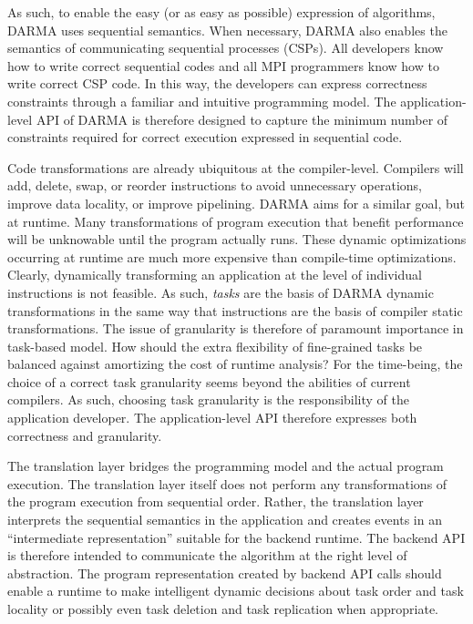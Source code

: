As such, to enable the easy (or as easy as possible) expression of algorithms, DARMA uses sequential semantics.
When necessary, DARMA also enables the semantics of communicating sequential processes (CSPs).
All developers know how to write correct sequential codes and all MPI programmers know how to write correct CSP code.
In this way, the developers can express correctness constraints through a familiar and intuitive programming model.
The application-level API of DARMA is therefore designed to capture the minimum number of constraints required for correct execution expressed in sequential code.

Code transformations are already ubiquitous at the compiler-level.
Compilers will add, delete, swap, or reorder instructions to avoid unnecessary operations, improve data locality, or improve pipelining.
DARMA aims for a similar goal, but at runtime.
Many transformations of program execution that benefit performance will be unknowable until the program actually runs.
These dynamic optimizations occurring at runtime are much more expensive than compile-time optimizations.
Clearly, dynamically transforming an application at the level of individual instructions is not feasible.
As such, \emph{tasks} are the basis of DARMA dynamic transformations in the same way that instructions are the basis of compiler static transformations.
The issue of granularity is therefore of paramount importance in task-based model.
How should the extra flexibility of fine-grained tasks be balanced against amortizing the cost of runtime analysis?
For the time-being, the choice of a correct task granularity seems beyond the abilities of current compilers.
As such, choosing task granularity is the responsibility of the application developer.
The application-level API therefore expresses both correctness and granularity.

The translation layer bridges the programming model and the actual program execution.
The translation layer itself does not perform any transformations of the program execution from sequential order.
Rather, the translation layer interprets the sequential semantics in the application and creates events in an ``intermediate representation'' suitable for the backend runtime.
The backend API is therefore intended to communicate the algorithm at the right level of abstraction.
The program representation created by backend API calls should enable a runtime to make intelligent dynamic decisions about task order and task locality or possibly even task deletion and task replication when appropriate.

